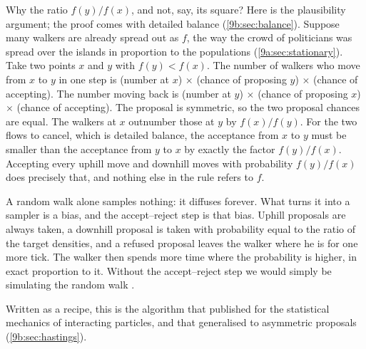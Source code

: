 Why the ratio $f(y)/f(x)$, and not, say, its square? Here is the plausibility argument; the
proof comes with detailed balance (\cref{9b:sec:balance}). Suppose many walkers are already spread out as $f$, the way the crowd
of politicians was spread over the islands in proportion to the populations
(\cref{9a:sec:stationary}). Take two points $x$ and $y$ with $f(y)<f(x)$. The number of walkers
who move from $x$ to $y$ in one step is (number at $x$) $\times$ (chance of proposing $y$)
$\times$ (chance of accepting). The number moving back is (number at $y$) $\times$ (chance of
proposing $x$) $\times$ (chance of accepting). The proposal is symmetric, so the two proposal
chances are equal. The walkers at $x$ outnumber those at $y$ by $f(x)/f(y)$. For the two flows
to cancel, which is detailed balance, the acceptance from $x$ to $y$ must be smaller than the
acceptance from $y$ to $x$ by exactly the factor $f(y)/f(x)$. Accepting every uphill move and
downhill moves with probability $f(y)/f(x)$ does precisely that, and nothing else in the rule
refers to $f$.

\begin{keyidea}
A random walk alone samples nothing: it diffuses forever. What turns it into a sampler is a
bias, and the accept--reject step is that bias. Uphill proposals are always taken, a downhill
proposal is taken with probability equal to the ratio of the target densities, and a refused
proposal leaves the walker where he is for one more tick. The walker then spends more time where
the probability is higher, in exact proportion to it. Without the accept--reject step we would
simply be simulating the random walk .
\end{keyidea}

Written as a recipe, this is the algorithm that \textcite{Metropolis1953} published for the
statistical mechanics of interacting particles, and that \textcite{Hastings1970} generalised to
asymmetric proposals (\cref{9b:sec:hastings}).

